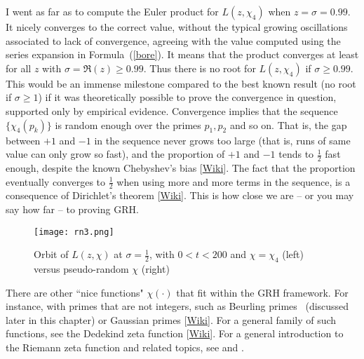 \documentclass[oneside,10pt]{book}
\begin{document}
I went as far as to compute the Euler product for $L(z,\chi_4)$ when $z=\sigma=0.99$. It nicely converges to the correct value, without the typical 
 growing oscillations associated to lack of convergence, 
 agreeing with the value computed using the series expansion in Formula~(\ref{bore}). It means that the product converges at least for all $z$ with
 $\sigma=\Re(z)\geq 0.99$. Thus there is no root for $L(z,\chi_4)$ if $\sigma\geq 0.99$. This would be an immense milestone compared to the best known result (no root if $\sigma\geq 1$) if it was theoretically possible to prove the convergence in question, supported only by empirical evidence. 
 Convergence implies that the sequence $\{\chi_4(p_k)\}$ is random enough over the primes $p_1,p_2$ and so on. That is, the gap between $+1$ and $-1$ in the sequence never grows too large (that is, runs of same value can only grow so fast), and the proportion of $+1$ and $-1$ tends to $\frac{1}{2}$ fast enough, despite the known \textcolor{index}{Chebyshev's bias} [\href{https://en.wikipedia.org/wiki/Chebyshev\%27s_bias}{Wiki}]. The fact that the proportion eventually converges to $\frac{1}{2}$ when using more and more terms in the sequence, is a consequence 
 of \textcolor{index}{Dirichlet's theorem} [\href{https://en.wikipedia.org/wiki/Dirichlet\%27s_theorem_on_arithmetic_progressions}{Wiki}]. This is how close we are -- or you may say how far -- to proving GRH.

\begin{figure}[H]
\centering
\texttt{[image: rn3.png]}  
\caption{Orbit of $L(z,\chi)$ at $\sigma=\frac{1}{2}$, with $0<t<200$ and $\chi=\chi_4$ (left) versus pseudo-random $\chi$ (right)}
\label{fig:rn2x}
\end{figure}

There are other ``nice functions" $\chi(\cdot)$ that fit within the GRH framework. For instance, with primes that are not integers, such as Beurling primes~\cite{bzf2004} (discussed later in this chapter) or \textcolor{index}{Gaussian primes} [\href{https://en.wikipedia.org/wiki/Gaussian_integer}{Wiki}]. For a general family of such functions, see the \textcolor{index}{Dedekind zeta function} [\href{https://en.wikipedia.org/wiki/Dedekind_zeta_function}{Wiki}]. For a general introduction to the Riemann zeta function and related topics, see \cite{kconrad2018} and \cite{tdr1987}.
\end{document}
